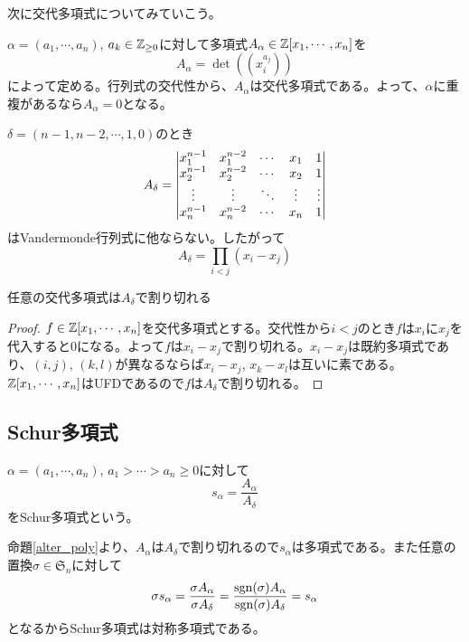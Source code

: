 \documentclass{ltjsreport}
\begin{document}
次に交代多項式についてみていこう。


\begin{defin}
    $\alpha=(a_1,\cdots,a_n)$, $a_k\in\mathbb{Z}_{\geq 0}$に対して多項式$A_\alpha\in\mathbb{Z}[x_1,\cdots,x_n]$を
    \[
        A_\alpha=\det((x_i^{a_j}))
    \]
    によって定める。行列式の交代性から、$A_\alpha$は交代多項式である。よって、$\alpha$に重複があるなら$A_\alpha=0$となる。
\end{defin}

\begin{eg}
    $\delta=(n-1,n-2,\cdots,1,0)$のとき
    \[
        A_\delta=\begin{vmatrix} x_1^{n-1}&x_1^{n-2}&\cdots&x_1&1\\
                       x_2^{n-1}&x_2^{n-2}&\cdots&x_2&1\\
                       \vdots&\vdots&\ddots&\vdots&\vdots\\
                       x_n^{n-1}&x_n^{n-2}&\cdots&x_n&1 \end{vmatrix}
    \]
    はVandermonde行列式に他ならない。したがって
    \[
    A_\delta=\prod_{i<j}(x_i-x_j)    
    \]
\end{eg}

\begin{prop}\label{alter_poly}
    任意の交代多項式は$A_\delta$で割り切れる
\end{prop}

\begin{proof}
    $f\in\mathbb{Z}[x_1,\cdots,x_n]$を交代多項式とする。交代性から$i<j$のとき$f$は$x_i$に$x_j$を代入すると$0$になる。よって$f$は$x_i-x_j$で割り切れる。$x_i-x_j$は既約多項式であり、$(i,j)$, $(k,l)$が異なるならば$x_i-x_j$, $x_k-x_l$は互いに素である。$\mathbb{Z}[x_1,\cdots,x_n]$はUFDであるので$f$は$A_\delta$で割り切れる。
\end{proof}


\subsection{Schur多項式}

\begin{defin}[Schur多項式]
    $\alpha=(a_1,\cdots,a_n)$, $a_1>\cdots> a_n\geq 0$に対して
    \[
    s_\alpha=\frac{A_\alpha}{A_\delta}  
    \]
    をSchur多項式という。
\end{defin}


命題\ref{alter_poly}より、$A_\alpha$は$A_\delta$で割り切れるので$s_\alpha$は多項式である。また任意の置換$\sigma\in\mathfrak{S}_n$に対して
\[
    \sigma s_\alpha=\frac{\sigma A_\alpha}{\sigma A_\delta}=\frac{\mathrm{sgn} (\sigma)A_\alpha}{\mathrm{sgn} (\sigma)A_\delta}=s_\alpha    
\]
となるからSchur多項式は対称多項式である。
\end{document}
